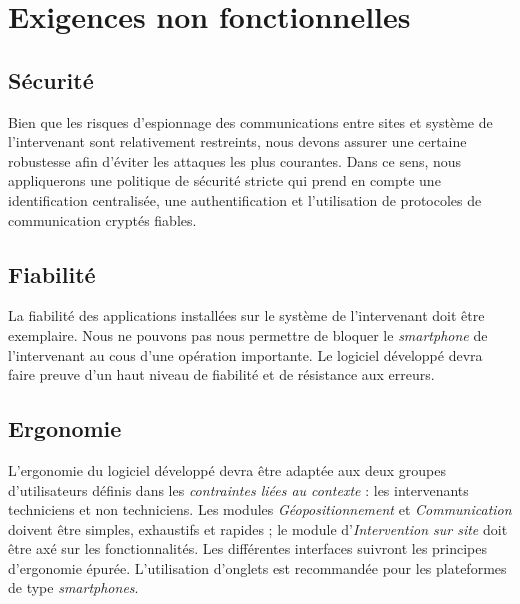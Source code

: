 \documentclass[a4paper, 11pt, final]{article}
\begin{document}



\section{Exigences non fonctionnelles}

\subsection{Sécurité}
Bien que les risques d'espionnage des communications entre sites et système de l'intervenant sont relativement restreints, nous devons assurer une certaine robustesse afin d'éviter les attaques les plus courantes. Dans ce sens, nous appliquerons une politique de sécurité stricte qui prend en compte une identification centralisée, une authentification et l'utilisation de protocoles de communication cryptés fiables.

\subsection{Fiabilité}
La fiabilité des applications installées sur le système de l'intervenant doit être exemplaire. Nous ne pouvons pas nous permettre de bloquer le \textit{smartphone} de l'intervenant au cous d'une opération importante. Le logiciel développé devra faire preuve d'un haut niveau de fiabilité et de résistance aux erreurs.

\subsection{Ergonomie}
L'ergonomie du logiciel développé devra être adaptée aux deux groupes d'utilisateurs définis dans les \textit{contraintes liées au contexte} : les intervenants techniciens et non techniciens. Les modules \emph{Géopositionnement} et \emph{Communication} doivent être simples, exhaustifs et rapides ; le module d'\emph{Intervention sur site} doit être axé sur les fonctionnalités. Les différentes interfaces suivront les principes d'ergonomie épurée. L'utilisation d'onglets est recommandée pour les plateformes de type \textit{smartphones}.
\end{document}
